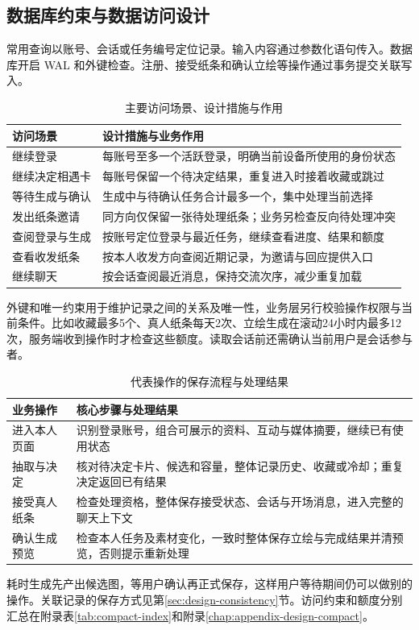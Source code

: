 \subsection{数据库约束与数据访问设计}
常用查询以账号、会话或任务编号定位记录。输入内容通过参数化语句传入。数据库开启 WAL 和外键检查。注册、接受纸条和确认立绘等操作通过事务提交关联写入。

\begin{table}[H]
\centering\small\linespread{1.15}\selectfont
\caption{主要访问场景、设计措施与作用}\label{tab:design-index-summary}
\begin{tabularx}{\linewidth}{@{}p{.31\linewidth}X@{}}
\toprule 访问场景 & 设计措施与业务作用 \\ \midrule
继续登录 & 每账号至多一个活跃登录，明确当前设备所使用的身份状态 \\
继续决定相遇卡 & 每账号保留一个待决定结果，重复进入时接着收藏或跳过 \\
等待生成与确认 & 生成中与待确认任务合计最多一个，集中处理当前选择 \\
发出纸条邀请 & 同方向仅保留一张待处理纸条；业务另检查反向待处理冲突 \\
查阅登录与生成 & 按账号定位登录与最近任务，继续查看进度、结果和额度 \\
查看收发纸条 & 按本人收发方向查阅近期记录，为邀请与回应提供入口 \\
继续聊天 & 按会话查阅最近消息，保持交流次序，减少重复加载 \\
\bottomrule
\end{tabularx}
\end{table}

外键和唯一约束用于维护记录之间的关系及唯一性，业务层另行校验操作权限与当前条件。比如收藏最多5个、真人纸条每天2次、立绘生成在滚动24小时内最多12次，服务端收到操作时才检查这些额度。读取会话前还需确认当前用户是会话参与者。

\begin{table}[H]
\centering\small\linespread{1.15}\selectfont
\caption{代表操作的保存流程与处理结果}\label{tab:design-access-path}
\begin{tabularx}{\linewidth}{@{}p{.20\linewidth}X@{}}
\toprule 业务操作 & 核心步骤与处理结果 \\ \midrule
进入本人页面 & 识别登录账号，组合可展示的资料、互动与媒体摘要，继续已有使用状态 \\
抽取与决定 & 核对待决定卡片、候选和容量，整体记录历史、收藏或冷却；重复决定返回已有结果 \\
接受真人纸条 & 检查处理资格，整体保存接受状态、会话与开场消息，进入完整的聊天上下文 \\
确认生成预览 & 检查本人任务及素材变化，一致时整体保存立绘与完成结果并清预览，否则提示重新处理 \\
\bottomrule
\end{tabularx}
\end{table}

耗时生成先产出候选图，等用户确认再正式保存，这样用户等待期间仍可以做别的操作。关联记录的保存方式见第\ref{sec:design-consistency}节。访问约束和额度分别汇总在附录表\ref{tab:compact-index}和附录\ref{chap:appendix-design-compact}。

\clearpage
